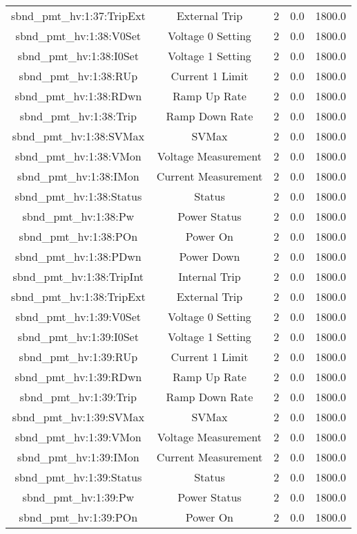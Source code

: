 \begin{center}
\begin{longtable}{c | c c c c }
sbnd\_pmt\_hv:1:37:TripExt & External Trip & 2 & 0.0 & 1800.0\\ 
sbnd\_pmt\_hv:1:38:V0Set & Voltage 0 Setting & 2 & 0.0 & 1800.0\\ 
sbnd\_pmt\_hv:1:38:I0Set & Voltage 1 Setting & 2 & 0.0 & 1800.0\\ 
sbnd\_pmt\_hv:1:38:RUp & Current 1 Limit & 2 & 0.0 & 1800.0\\ 
sbnd\_pmt\_hv:1:38:RDwn & Ramp Up Rate & 2 & 0.0 & 1800.0\\ 
sbnd\_pmt\_hv:1:38:Trip & Ramp Down Rate & 2 & 0.0 & 1800.0\\ 
sbnd\_pmt\_hv:1:38:SVMax & SVMax & 2 & 0.0 & 1800.0\\ 
sbnd\_pmt\_hv:1:38:VMon & Voltage Measurement & 2 & 0.0 & 1800.0\\ 
sbnd\_pmt\_hv:1:38:IMon & Current Measurement & 2 & 0.0 & 1800.0\\ 
sbnd\_pmt\_hv:1:38:Status & Status & 2 & 0.0 & 1800.0\\ 
sbnd\_pmt\_hv:1:38:Pw & Power Status & 2 & 0.0 & 1800.0\\ 
sbnd\_pmt\_hv:1:38:POn & Power On & 2 & 0.0 & 1800.0\\ 
sbnd\_pmt\_hv:1:38:PDwn & Power Down & 2 & 0.0 & 1800.0\\ 
sbnd\_pmt\_hv:1:38:TripInt & Internal Trip & 2 & 0.0 & 1800.0\\ 
sbnd\_pmt\_hv:1:38:TripExt & External Trip & 2 & 0.0 & 1800.0\\ 
sbnd\_pmt\_hv:1:39:V0Set & Voltage 0 Setting & 2 & 0.0 & 1800.0\\ 
sbnd\_pmt\_hv:1:39:I0Set & Voltage 1 Setting & 2 & 0.0 & 1800.0\\ 
sbnd\_pmt\_hv:1:39:RUp & Current 1 Limit & 2 & 0.0 & 1800.0\\ 
sbnd\_pmt\_hv:1:39:RDwn & Ramp Up Rate & 2 & 0.0 & 1800.0\\ 
sbnd\_pmt\_hv:1:39:Trip & Ramp Down Rate & 2 & 0.0 & 1800.0\\ 
sbnd\_pmt\_hv:1:39:SVMax & SVMax & 2 & 0.0 & 1800.0\\ 
sbnd\_pmt\_hv:1:39:VMon & Voltage Measurement & 2 & 0.0 & 1800.0\\ 
sbnd\_pmt\_hv:1:39:IMon & Current Measurement & 2 & 0.0 & 1800.0\\ 
sbnd\_pmt\_hv:1:39:Status & Status & 2 & 0.0 & 1800.0\\ 
sbnd\_pmt\_hv:1:39:Pw & Power Status & 2 & 0.0 & 1800.0\\ 
sbnd\_pmt\_hv:1:39:POn & Power On & 2 & 0.0 & 1800.0\\ 

\end{longtable}
\end{center}
